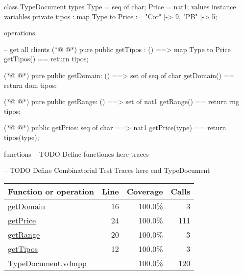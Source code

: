 \begin{vdmpp}[breaklines=true]
class TypeDocument
types
Type = seq of char;
Price = nat1;
values
instance variables
 private tipos : map Type to Price :=  { "Cor" |-> 9, "PB" |-> 5};
 
operations

-- get all clients
(*@
\label{getTipos:12}
@*)
 pure public getTipos : () ==> map Type to Price
  getTipos() ==
  return tipos;
 
(*@
\label{getDomain:16}
@*)
 pure public getDomain: () ==> set of seq of char
  getDomain() ==
  return dom tipos;
 
(*@
\label{getRange:20}
@*)
 pure public getRange: () ==> set of nat1
  getRange() ==
  return rng tipos;
 
(*@
\label{getPrice:24}
@*)
 public getPrice: seq of char ==> nat1
  getPrice(type) ==
   return tipos(type);
   
  
  
 
 
functions
-- TODO Define functiones here
traces

-- TODO Define Combinatorial Test Traces here
end TypeDocument
\end{vdmpp}
\bigskip
\begin{longtable}{|l|r|r|r|}
\hline
Function or operation & Line & Coverage & Calls \\
\hline
\hline
\hyperref[getDomain:16]{getDomain} & 16&100.0\% & 3 \\
\hline
\hyperref[getPrice:24]{getPrice} & 24&100.0\% & 111 \\
\hline
\hyperref[getRange:20]{getRange} & 20&100.0\% & 3 \\
\hline
\hyperref[getTipos:12]{getTipos} & 12&100.0\% & 3 \\
\hline
\hline
TypeDocument.vdmpp & & 100.0\% & 120 \\
\hline
\end{longtable}

